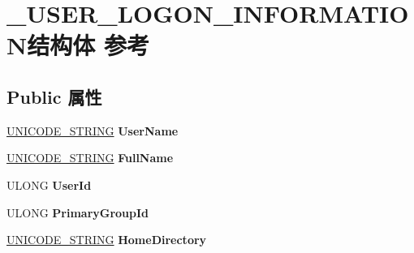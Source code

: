 \hypertarget{struct___u_s_e_r___l_o_g_o_n___i_n_f_o_r_m_a_t_i_o_n}{}\section{\+\_\+\+U\+S\+E\+R\+\_\+\+L\+O\+G\+O\+N\+\_\+\+I\+N\+F\+O\+R\+M\+A\+T\+I\+O\+N结构体 参考}
\label{struct___u_s_e_r___l_o_g_o_n___i_n_f_o_r_m_a_t_i_o_n}
\subsection*{Public 属性}
\begin{DoxyCompactItemize}
\item 
\mbox{\label{struct___u_s_e_r___l_o_g_o_n___i_n_f_o_r_m_a_t_i_o_n_adf631ea84cce979fadb243c86d7d63fe}} 
\hyperlink{struct___u_n_i_c_o_d_e___s_t_r_i_n_g}{U\+N\+I\+C\+O\+D\+E\+\_\+\+S\+T\+R\+I\+NG} {\bfseries User\+Name}
\item 
\mbox{\label{struct___u_s_e_r___l_o_g_o_n___i_n_f_o_r_m_a_t_i_o_n_a0f380137e8c8e5e0234f5faef9f14d95}} 
\hyperlink{struct___u_n_i_c_o_d_e___s_t_r_i_n_g}{U\+N\+I\+C\+O\+D\+E\+\_\+\+S\+T\+R\+I\+NG} {\bfseries Full\+Name}
\item 
\mbox{\label{struct___u_s_e_r___l_o_g_o_n___i_n_f_o_r_m_a_t_i_o_n_a0b3b52c61b3bdec604aaa99e23a7d9d0}} 
U\+L\+O\+NG {\bfseries User\+Id}
\item 
\mbox{\label{struct___u_s_e_r___l_o_g_o_n___i_n_f_o_r_m_a_t_i_o_n_ae8fb90e15d3e2181b343b8f64e4bf8b3}} 
U\+L\+O\+NG {\bfseries Primary\+Group\+Id}
\item 
\mbox{\label{struct___u_s_e_r___l_o_g_o_n___i_n_f_o_r_m_a_t_i_o_n_a1eb73ed195448fbbfb6c003f43375b8a}} 
\hyperlink{struct___u_n_i_c_o_d_e___s_t_r_i_n_g}{U\+N\+I\+C\+O\+D\+E\+\_\+\+S\+T\+R\+I\+NG} {\bfseries Home\+Directory}
\item 
\mbox{\label{struct___u_s_e_r___l_o_g_o_n___i_n_f_o_r_m_a_t_i_o_n_a09b32d5fac906f12b60c66f1d8b295e3}} 

\end{DoxyCompactItemize}

